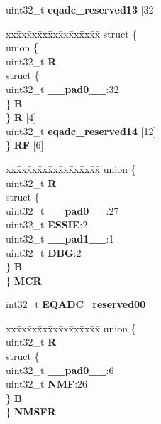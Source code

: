 \begin{DoxyCompactItemize}
\begin{tabbing}
\end{tabbing}\item 
\mbox{\label{structEQADC__tag_a1a3b394ce108c2749011855602fc425c}} 
uint32\+\_\+t {\bfseries eqadc\+\_\+reserved13} \mbox{[}32\mbox{]}
\item 
\mbox{\label{structEQADC__tag_a0a8d0468e9a983d25234895987ee57bc}} 
\begin{tabbing}
xx\=xx\=xx\=xx\=xx\=xx\=xx\=xx\=xx\=\kill
struct \{\\
\>union \{\\
\>\>uint32\_t {\bfseries R}\\
\>\>struct \{\\
\>\>\>uint32\_t {\bfseries \_\_pad0\_\_}:32\\
\>\>\} {\bfseries B}\\
\>\} {\bfseries R} \mbox{[}4\mbox{]}\\
\>uint32\_t {\bfseries eqadc\_reserved14} \mbox{[}12\mbox{]}\\
\} {\bfseries RF} \mbox{[}6\mbox{]}\\

\end{tabbing}\item 
\mbox{\label{structEQADC__tag_aac9a9da29177288455584428b5643cb5}} 
\begin{tabbing}
xx\=xx\=xx\=xx\=xx\=xx\=xx\=xx\=xx\=\kill
union \{\\
\>uint32\_t {\bfseries R}\\
\>struct \{\\
\>\>uint32\_t {\bfseries \_\_pad0\_\_}:27\\
\>\>uint32\_t {\bfseries ESSIE}:2\\
\>\>uint32\_t {\bfseries \_\_pad1\_\_}:1\\
\>\>uint32\_t {\bfseries DBG}:2\\
\>\} {\bfseries B}\\
\} {\bfseries MCR}\\

\end{tabbing}\item 
\mbox{\label{structEQADC__tag_a82607e4b0b8103ef589fd0e974ad61c4}} 
int32\+\_\+t {\bfseries E\+Q\+A\+D\+C\+\_\+reserved00}
\item 
\mbox{\label{structEQADC__tag_a274bc4b06fae52de3d92ed13aa559916}} 
\begin{tabbing}
xx\=xx\=xx\=xx\=xx\=xx\=xx\=xx\=xx\=\kill
union \{\\
\>uint32\_t {\bfseries R}\\
\>struct \{\\
\>\>uint32\_t {\bfseries \_\_pad0\_\_}:6\\
\>\>uint32\_t {\bfseries NMF}:26\\
\>\} {\bfseries B}\\
\} {\bfseries NMSFR}\\


\end{tabbing}
\end{DoxyCompactItemize}
